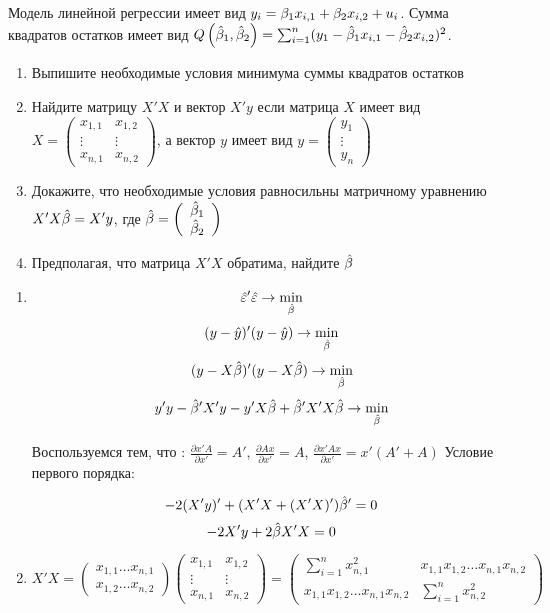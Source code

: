 \begin{problem}
Модель линейной регрессии имеет вид $y_i=\beta_1 x_{i,1}+\beta_2 x_{i,2} + u_i$.
Сумма квадратов остатков имеет вид $Q\left(\hat{\beta}_1,\hat{\beta}_2\right)=\sum_{i=1}^n (y_1-\hat{\beta}_1 x_{i,1}-\hat{\beta}_2 x_{i,2})^2$.
\begin{enumerate}
\item Выпишите необходимые условия минимума суммы квадратов остатков
\item Найдите матрицу $X'X$ и вектор $X'y$ если матрица $X$ имеет вид
$X=
\left(
\begin{array}{cc}
x_{1,1} & x_{1,2} \\
\vdots & \vdots \\
x_{n,1} & x_{n,2}
\end{array}
\right)
$,
а вектор $y$ имеет вид
$y=
\left(
\begin{array}{c}
y_1 \\
\vdots \\
y_n
\end{array}
\right)
$
\item Докажите, что необходимые условия равносильны матричному уравнению $X'X\hat{\beta}=X'y$, где
$\hat{\beta}=
\left(
\begin{array}{c}
\hat{\beta}_1 \\
\hat{\beta}_2
\end{array}
\right)
$
\item Предполагая, что матрица $X'X$ обратима, найдите $\hat{\beta}$
\end{enumerate}

\begin{sol}
\begin{enumerate}
\item
\[\hat{\varepsilon}'\hat{\varepsilon}\rightarrow \min_{\hat{\beta}}\]
\[(y-\hat{y})'(y-\hat{y})\rightarrow\min_{\hat{\beta}}\]
\[(y-X\hat{\beta})'(y-X\hat{\beta})\rightarrow\min_{\hat{\beta}}\]
\[y'y-\hat{\beta}' X'y-y'X\hat{\beta}+\hat{\beta}'X'X\hat{\beta}\rightarrow\min_{\hat{\beta}}\]

Воспользуемся тем, что : $\frac{\partial x'A}{\partial x'}=A'$, $\frac{\partial Ax}{\partial x'}=A$,
$\frac{\partial x'Ax}{\partial x'}=x'(A'+A)$
Условие первого порядка:

\[-2(X'y)'+(X'X+(X'X)')\hat{\beta}'=0\]
\[-2X'y+2\hat{\beta} X'X=0\]

\item
$X'X=\begin{pmatrix}
x_{1,1}\ldots x_{n,1}\\
x_{1,2}\ldots x_{n,2}
\end{pmatrix}
\begin{pmatrix}
x_{1,1}& x_{1,2}\\
\vdots&\vdots\\
x_{n,1}& x_{n,2}
\end{pmatrix}=
\begin{pmatrix}
\sum_{i=1}^n x^2_{n,1}& x_{1,1}x_{1,2}\ldots x_{n,1}x_{n,2}\\
x_{1,1}x_{1,2}\ldots x_{n,1}x_{n,2}&\sum_{i=1}^nx^2_{n,2}
\end{pmatrix}$


\end{enumerate}
\end{sol}
\end{problem}
